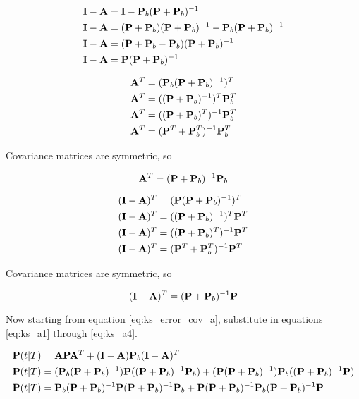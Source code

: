 \begin{align}
  \mathbf{I} - \mathbf{A} &= \mathbf{I} - \mathbf{P}_b(\mathbf{P} + \mathbf{P}_b)^{-1} \nonumber
    \\
  \mathbf{I} - \mathbf{A} &= (\mathbf{P} + \mathbf{P}_b)(\mathbf{P} + \mathbf{P}_b)^{-1} -
    \mathbf{P}_b(\mathbf{P} + \mathbf{P}_b)^{-1} \nonumber \\
  \mathbf{I} - \mathbf{A} &= (\mathbf{P} + \mathbf{P}_b - \mathbf{P}_b)
    (\mathbf{P} + \mathbf{P}_b)^{-1} \nonumber \\
  \mathbf{I} - \mathbf{A} &= \mathbf{P}(\mathbf{P} + \mathbf{P}_b)^{-1}
\end{align}

\begin{align*}
  \mathbf{A}^T &= (\mathbf{P}_b(\mathbf{P} + \mathbf{P}_b)^{-1})^T \\
  \mathbf{A}^T &= ((\mathbf{P} + \mathbf{P}_b)^{-1})^T\mathbf{P}_b^T \\
  \mathbf{A}^T &= ((\mathbf{P} + \mathbf{P}_b)^T)^{-1}\mathbf{P}_b^T \\
  \mathbf{A}^T &= (\mathbf{P}^T + \mathbf{P}_b^T)^{-1}\mathbf{P}_b^T
\end{align*}

Covariance matrices are symmetric, so

\begin{equation}
  \mathbf{A}^T = (\mathbf{P} + \mathbf{P}_b)^{-1}\mathbf{P}_b
\end{equation}

\begin{align*}
  (\mathbf{I} - \mathbf{A})^T &= (\mathbf{P}(\mathbf{P} + \mathbf{P}_b)^{-1})^T \\
  (\mathbf{I} - \mathbf{A})^T &= ((\mathbf{P} + \mathbf{P}_b)^{-1})^T\mathbf{P}^T \\
  (\mathbf{I} - \mathbf{A})^T &= ((\mathbf{P} + \mathbf{P}_b)^T)^{-1}\mathbf{P}^T \\
  (\mathbf{I} - \mathbf{A})^T &= (\mathbf{P}^T + \mathbf{P}_b^T)^{-1}\mathbf{P}^T
\end{align*}

Covariance matrices are symmetric, so

\begin{equation}
  (\mathbf{I} - \mathbf{A})^T = (\mathbf{P} + \mathbf{P}_b)^{-1}\mathbf{P} \label{eq:ks_a4}
\end{equation}

Now starting from equation \eqref{eq:ks_error_cov_a}, substitute in equations
\eqref{eq:ks_a1} through \eqref{eq:ks_a4}.

\begin{align*}
  \mathbf{P}(t|T) &=
    \mathbf{A}\mathbf{P}\mathbf{A}^T + (\mathbf{I} - \mathbf{A})\mathbf{P}_b(\mathbf{I} - \mathbf{A})^T
    \\
  \mathbf{P}(t|T) &=
    (\mathbf{P}_b(\mathbf{P} + \mathbf{P}_b)^{-1})\mathbf{P}
      ((\mathbf{P} + \mathbf{P}_b)^{-1}\mathbf{P}_b) +
    (\mathbf{P}(\mathbf{P} + \mathbf{P}_b)^{-1})\mathbf{P}_b
      ((\mathbf{P} + \mathbf{P}_b)^{-1}\mathbf{P}) \\
  \mathbf{P}(t|T) &=
    \mathbf{P}_b(\mathbf{P} + \mathbf{P}_b)^{-1}\mathbf{P}
    (\mathbf{P} + \mathbf{P}_b)^{-1}\mathbf{P}_b + \mathbf{P}
      (\mathbf{P} + \mathbf{P}_b)^{-1}\mathbf{P}_b
      (\mathbf{P} + \mathbf{P}_b)^{-1}\mathbf{P}
\end{align*}

